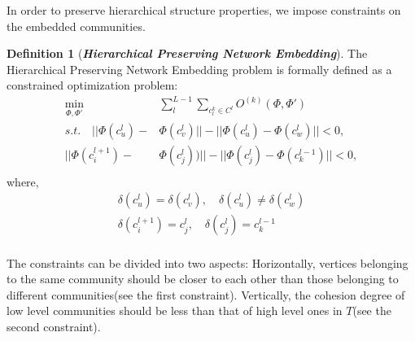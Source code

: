 \documentclass{article}
\theoremstyle{definition}
\newtheorem{defn}{Definition}
\begin{document}
		
		In order to preserve hierarchical structure properties, we impose constraints on the embedded communities.
 
		\begin{defn}[\textbf{\emph{Hierarchical Preserving Network Embedding}}]
			The Hierarchical Preserving Network Embedding problem is formally defined as a constrained optimization problem:
			\begin{equation}
			\label{equ:whole_loss}
			\begin{split}
			\min_{\Phi,\Phi'} & \sum_l^{L-1}\sum_{c^k_l \in C^l} O^{(k)}(\Phi, \Phi') \\
			s.t. \quad
			|| \Phi(c_u^l) - & \Phi(c_v^l) || - ||\Phi(c_u^l) - \Phi(c_w^l)|| < 0, \\
			|| \Phi(c_i^{l+1}) - & \Phi(c_j^{l})) || - ||\Phi(c_j^{l}) - \Phi(c_k^{l - 1})|| < 0,\\
			\end{split}
			\end{equation}
			where,
			\[
			\begin{split}
				\delta(c_u^l) = \delta(c_v^l), \quad \delta(c_u^l) \neq \delta(c_w^l)\\
				\delta(c_i^{l+1}) = c^l_j, \quad \delta(c^l_j) = c^{l - 1}_k \\ 
			\end{split}
			\]
		\end{defn}
		The constraints can be divided into two aspects: Horizontally, vertices belonging to the same community should be closer to each other than those belonging to different communities(see the first constraint).
		Vertically, the cohesion degree of low level communities should be less than that of high level ones in $T$(see the second constraint). 
	
\end{document}
